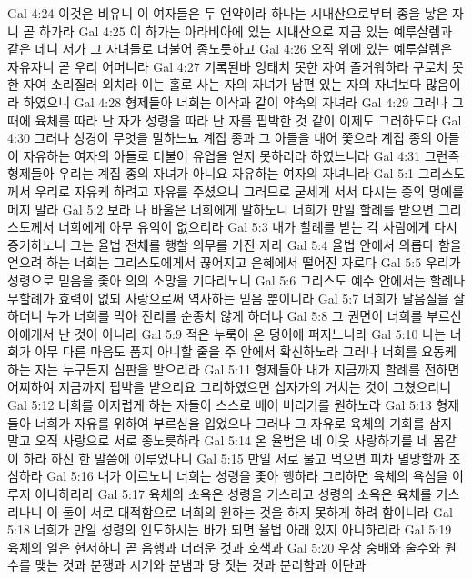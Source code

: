Gal 4:24  이것은 비유니 이 여자들은 두 언약이라 하나는 시내산으로부터 종을 낳은 자니 곧 하가라
Gal 4:25  이 하가는 아라비아에 있는 시내산으로 지금 있는 예루살렘과 같은 데니 저가 그 자녀들로 더불어 종노릇하고
Gal 4:26  오직 위에 있는 예루살렘은 자유자니 곧 우리 어머니라
Gal 4:27  기록된바 잉태치 못한 자여 즐거워하라 구로치 못한 자여 소리질러 외치라 이는 홀로 사는 자의 자녀가 남편 있는 자의 자녀보다 많음이라 하였으니
Gal 4:28  형제들아 너희는 이삭과 같이 약속의 자녀라
Gal 4:29  그러나 그 때에 육체를 따라 난 자가 성령을 따라 난 자를 핍박한 것 같이 이제도 그러하도다
Gal 4:30  그러나 성경이 무엇을 말하느뇨 계집 종과 그 아들을 내어 쫓으라 계집 종의 아들이 자유하는 여자의 아들로 더불어 유업을 얻지 못하리라 하였느니라
Gal 4:31  그런즉 형제들아 우리는 계집 종의 자녀가 아니요 자유하는 여자의 자녀니라
Gal 5:1  그리스도께서 우리로 자유케 하려고 자유를 주셨으니 그러므로 굳세게 서서 다시는 종의 멍에를 메지 말라
Gal 5:2  보라 나 바울은 너희에게 말하노니 너희가 만일 할례를 받으면 그리스도께서 너희에게 아무 유익이 없으리라
Gal 5:3  내가 할례를 받는 각 사람에게 다시 증거하노니 그는 율법 전체를 행할 의무를 가진 자라
Gal 5:4  율법 안에서 의롭다 함을 얻으려 하는 너희는 그리스도에게서 끊어지고 은혜에서 떨어진 자로다
Gal 5:5  우리가 성령으로 믿음을 좇아 의의 소망을 기다리노니
Gal 5:6  그리스도 예수 안에서는 할례나 무할례가 효력이 없되 사랑으로써 역사하는 믿음 뿐이니라
Gal 5:7  너희가 달음질을 잘 하더니 누가 너희를 막아 진리를 순종치 않게 하더냐
Gal 5:8  그 권면이 너희를 부르신 이에게서 난 것이 아니라
Gal 5:9  적은 누룩이 온 덩이에 퍼지느니라
Gal 5:10  나는 너희가 아무 다른 마음도 품지 아니할 줄을 주 안에서 확신하노라 그러나 너희를 요동케 하는 자는 누구든지 심판을 받으리라
Gal 5:11  형제들아 내가 지금까지 할례를 전하면 어찌하여 지금까지 핍박을 받으리요 그리하였으면 십자가의 거치는 것이 그쳤으리니
Gal 5:12  너희를 어지럽게 하는 자들이 스스로 베어 버리기를 원하노라
Gal 5:13  형제들아 너희가 자유를 위하여 부르심을 입었으나 그러나 그 자유로 육체의 기회를 삼지 말고 오직 사랑으로 서로 종노릇하라
Gal 5:14  온 율법은 네 이웃 사랑하기를 네 몸같이 하라 하신 한 말씀에 이루었나니
Gal 5:15  만일 서로 물고 먹으면 피차 멸망할까 조심하라
Gal 5:16  내가 이르노니 너희는 성령을 좇아 행하라 그리하면 육체의 욕심을 이루지 아니하리라
Gal 5:17  육체의 소욕은 성령을 거스리고 성령의 소욕은 육체를 거스리나니 이 둘이 서로 대적함으로 너희의 원하는 것을 하지 못하게 하려 함이니라
Gal 5:18  너희가 만일 성령의 인도하시는 바가 되면 율법 아래 있지 아니하리라
Gal 5:19  육체의 일은 현저하니 곧 음행과 더러운 것과 호색과
Gal 5:20  우상 숭배와 술수와 원수를 맺는 것과 분쟁과 시기와 분냄과 당 짓는 것과 분리함과 이단과
